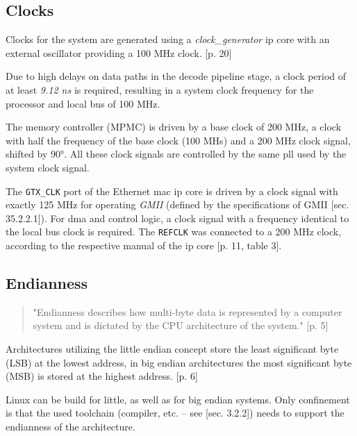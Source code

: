 \subsection{Clocks}
\label{sec:clocks}

Clocks for the system are generated using a \textit{clock\_generator} \gls{ip} core with an external oscillator providing a 100 MHz clock. \cite{ug347}[p. 20]

Due to high delays on data paths in the decode pipeline stage, a clock period of at least \textit{9.12 ns} is required, resulting in a system clock frequency for the processor and local bus of 100 MHz.

The memory controller (MPMC) is driven by a base clock of 200 MHz, a clock with half the frequency of the base clock (100 MHs) and a 200 MHz clock signal, shifted by 90°. All these clock signals are controlled by the same \gls{pll} used by the system clock signal.

The \texttt{GTX\_CLK} port of the Ethernet \gls{mac} \gls{ip} core is driven by a clock signal with exactly 125 MHz for operating \textit{GMII} (defined by the specifications of GMII \cite{ieee802_3}[sec. 35.2.2.1]). For \gls{dma} and control logic, a clock signal with a frequency identical to the local bus clock is required. The \texttt{REFCLK} was connected to a 200 MHz clock, according to the respective manual of the \gls{ip} core \cite{xps_ll_temac}[p. 11, table 3].

\subsection{Endianness}

\begin{quote}
 "Endianness describes how multi-byte data is represented by a computer system and is dictated by the CPU architecture of the system." \cite{intel_endiannness}[p. 5]
\end{quote}

Architectures utilizing the little endian concept store the least significant byte (LSB) at the lowest address, in big endian architectures the most significant byte (MSB) is stored at the highest address. \cite{intel_endiannness}[p. 6]

Linux can be build for little, as well as for big endian systems. Only confinement is that the used toolchain (compiler, etc. -- see \cite{projectseminar}[sec. 3.2.2]) needs to support the endianness of the architecture.

